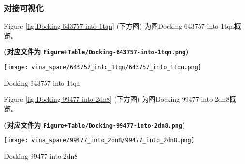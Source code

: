 \documentclass[
]{article}
\begin{document}
\hypertarget{ux5bf9ux63a5ux53efux89c6ux5316}{%
\subsubsection{对接可视化}\label{ux5bf9ux63a5ux53efux89c6ux5316}}

\begin{center}\vspace{1.5cm}\end{center}

Figure \ref{fig:Docking-643757-into-1tqn} (下方图) 为图Docking 643757 into 1tqn概览。

\textbf{(对应文件为 \texttt{Figure+Table/Docking-643757-into-1tqn.png})}

\def\@captype{figure}
\begin{center}
\texttt{[image: vina\_space/643757\_into\_1tqn/643757\_into\_1tqn.png]}
\caption{Docking 643757 into 1tqn}\label{fig:Docking-643757-into-1tqn}
\end{center}

\begin{center}\vspace{1.5cm}\end{center}

\begin{center}\vspace{1.5cm}\end{center}

Figure \ref{fig:Docking-99477-into-2dn8} (下方图) 为图Docking 99477 into 2dn8概览。

\textbf{(对应文件为 \texttt{Figure+Table/Docking-99477-into-2dn8.png})}

\def\@captype{figure}
\begin{center}
\texttt{[image: vina\_space/99477\_into\_2dn8/99477\_into\_2dn8.png]}
\caption{Docking 99477 into 2dn8}\label{fig:Docking-99477-into-2dn8}
\end{center}

\begin{center}\vspace{1.5cm}\end{center}

\begin{center}\vspace{1.5cm}\end{center}
\end{document}
